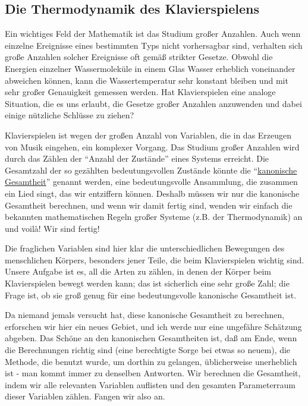 
\subsection{Die Thermodynamik des Klavierspielens}
\label{c1iv3}

Ein wichtiges Feld der Mathematik ist das Studium großer Anzahlen.
Auch wenn einzelne Ereignisse eines bestimmten Typs nicht vorhersagbar sind, verhalten sich große Anzahlen solcher Ereignisse oft gemäß strikter Gesetze.
Obwohl die Energien einzelner Wassermoleküle in einem Glas Wasser erheblich voneinander abweichen können, kann die Wassertemperatur sehr konstant bleiben und mit sehr großer Genauigkeit gemessen werden.
Hat Klavierspielen eine analoge Situation, die es uns erlaubt, die Gesetze großer Anzahlen anzuwenden und dabei einige nützliche Schlüsse zu ziehen?


\label{canonic}

Klavierspielen ist wegen der großen Anzahl von Variablen, die in das Erzeugen von Musik eingehen, ein komplexer Vorgang.
Das Studium großer Anzahlen wird durch das Zählen der \enquote{Anzahl der Zustände} eines Systems erreicht.
Die Gesamtzahl der so gezählten bedeutungsvollen Zustände könnte die \enquote{\hyperref[ueb-canonic]{kanonische Gesamtheit}} genannt werden, eine bedeutungsvolle Ansammlung, die zusammen ein Lied singt, das wir entziffern können.
Deshalb müssen wir nur die kanonische Gesamtheit berechnen, und wenn wir damit fertig sind, wenden wir einfach die bekannten mathematischen Regeln großer Systeme (z.B. der Thermodynamik) an und voilà!
Wir sind fertig!

Die fraglichen Variablen sind hier klar die unterschiedlichen Bewegungen des menschlichen Körpers, besonders jener Teile, die beim Klavierspielen wichtig sind.
Unsere Aufgabe ist es, all die Arten zu zählen, in denen der Körper beim Klavierspielen bewegt werden kann; das ist sicherlich eine sehr große Zahl; die Frage ist, ob sie groß genug für eine bedeutungsvolle kanonische Gesamtheit ist.

Da niemand jemals versucht hat, diese kanonische Gesamtheit zu berechnen, erforschen wir hier ein neues Gebiet, und ich werde nur eine ungefähre Schätzung abgeben.
Das Schöne an den kanonischen Gesamtheiten ist, daß am Ende, wenn die Berechnungen richtig sind (eine berechtigte Sorge bei etwas so neuem), die Methode, die benutzt wurde, um dorthin zu gelangen, üblicherweise unerheblich ist - man kommt immer zu denselben Antworten.
Wir berechnen die Gesamtheit, indem wir alle relevanten Variablen auflisten und den gesamten Parameterraum dieser Variablen zählen.
Fangen wir also an.

